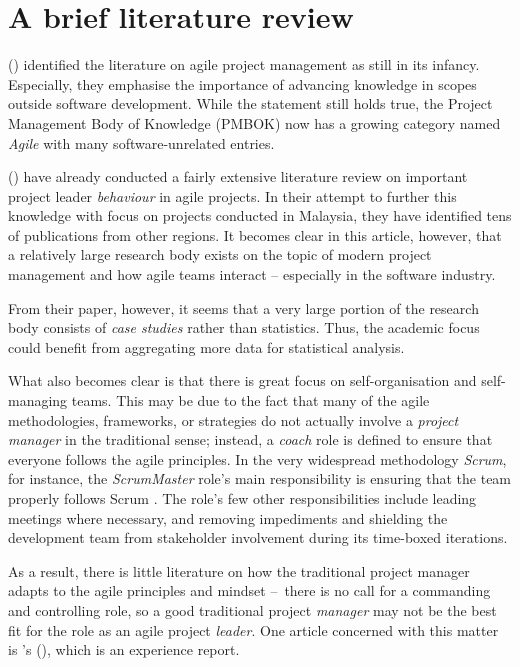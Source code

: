 \section{A brief literature review}

\citeauthor{fernandez:agilevstraditional} (\citeyear{fernandez:agilevstraditional}) identified the literature on agile project management as still in its infancy. Especially, they emphasise the importance of advancing knowledge in scopes outside software development. While the statement still holds true, the Project Management Body of Knowledge (PMBOK) now has a growing category named \emph{Agile} \parencite{pmbok} with many software-unrelated entries.

\citeauthor{sutling:taxonomy} (\citeyear{sutling:taxonomy}) have already conducted a fairly extensive literature review on important project leader \emph{behaviour} in agile projects. In their attempt to further this knowledge with focus on projects conducted in Malaysia, they have identified tens of publications from other regions. It becomes clear in this article, however, that a relatively large research body exists on the topic of modern project management and how agile teams interact – especially in the software industry.

From their paper, however, it seems that a very large portion of the research body consists of \emph{case studies} rather than statistics. Thus, the academic focus could benefit from aggregating more data for statistical analysis.

What also becomes clear is that there is great focus on self-organisation and self-managing teams. This may be due to the fact that many of the agile methodologies, frameworks, or strategies do not actually involve a \emph{project manager} in the traditional sense; instead, a \emph{coach} role is defined to ensure that everyone follows the agile principles. In the very widespread methodology \emph{Scrum}, for instance, the \emph{ScrumMaster} role's main responsibility is ensuring that the team properly follows Scrum \autocite{schwaber:scrum}. The role's few other responsibilities include leading meetings where necessary, and removing impediments and shielding the development team from stakeholder involvement during its time-boxed iterations.

As a result, there is little literature on how the traditional project manager adapts to the agile principles and mindset – there is no call for a commanding and controlling role, so a good traditional project \emph{manager} may not be the best fit for the role as an agile project \emph{leader}. One article concerned with this matter is \citeauthor{yi:managerasscrummaster}'s  (\citeyear{yi:managerasscrummaster}), which is an experience report.
